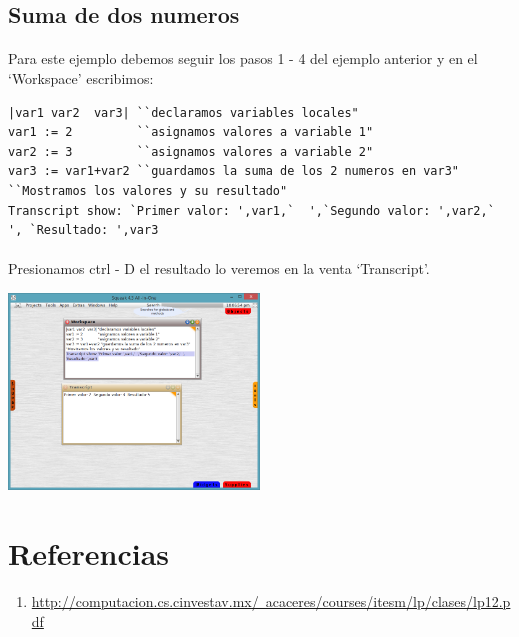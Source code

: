 \documentclass[11pt]{article}
\begin{document}
\begin{enumerate}
\subsection{\textbf{Suma de dos numeros}}
\paragraph{}\noindent
Para este ejemplo debemos seguir los pasos 1 - 4  del ejemplo anterior y en el `Workspace' escribimos:
\begin{lstlisting}
|var1 var2  var3| ``declaramos variables locales"
var1 := 2		  ``asignamos valores a variable 1"
var2 := 3		  ``asignamos valores a variable 2"
var3 := var1+var2 ``guardamos la suma de los 2 numeros en var3"
``Mostramos los valores y su resultado"
Transcript show: `Primer valor: ',var1,`  ',`Segundo valor: ',var2,`  ', `Resultado: ',var3 
\end{lstlisting}
\paragraph{}\noindent
Presionamos ctrl - D el resultado lo veremos en la venta `Transcript'.

				\begin{center}
				\includegraphics[width=0.5\textwidth]{images/second_example}
				\end{center}


\end{enumerate}



\section{Referencias}

\begin{enumerate}
	\item \href{http://computacion.cs.cinvestav.mx/~acaceres/courses/itesm/lp/clases/lp12.pdf}{http://computacion.cs.cinvestav.mx/~acaceres/courses/itesm/lp/clases/lp12.pdf}
\end{enumerate}



\end{document}
